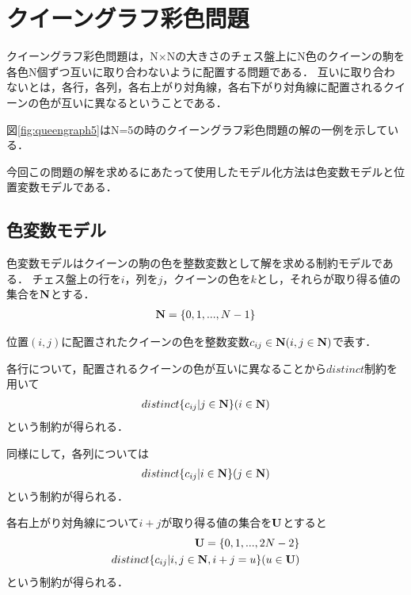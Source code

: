 \chapter{クイーングラフ彩色問題}

クイーングラフ彩色問題は，N×Nの大きさのチェス盤上にN色のクイーンの駒を各色N個ずつ互いに取り合わないように配置する問題である．
互いに取り合わないとは，各行，各列，各右上がり対角線，各右下がり対角線に配置されるクイーンの色が互いに異なるということである．

\label{fig:queengraph5}

図\ref{fig:queengraph5}はN=5の時のクイーングラフ彩色問題の解の一例を示している．

今回この問題の解を求めるにあたって使用したモデル化方法は色変数モデルと位置変数モデルである．

\section{色変数モデル}
色変数モデルはクイーンの駒の色を整数変数として解を求める制約モデルである．
チェス盤上の行を$i$，列を$j$，クイーンの色を$k$とし，それらが取り得る値の集合を$\bf N$とする．
\begin{eqnarray*}
    {\bf N} = \{0,1,...,N-1\}
\end{eqnarray*}

位置$(i,j)$に配置されたクイーンの色を整数変数$c_{ij} \in {\bf N} (i,j \in {\bf N})$で表す．

各行について，配置されるクイーンの色が互いに異なることから$distinct$制約を用いて
\begin{eqnarray*}
    distinct\{c_{ij} | j \in {\bf N} \} (i \in {\bf N})
\end{eqnarray*}
という制約が得られる．

同様にして，各列については
\begin{eqnarray*}
    distinct\{c_{ij} | i \in {\bf N} \} (j \in {\bf N})
\end{eqnarray*}
という制約が得られる．

各右上がり対角線について$i+j$が取り得る値の集合を$\bf U$とすると
\begin{eqnarray*}
    {\bf U} = \{0,1,...,2N-2\} \\
    distinct\{c_{ij} | i,j \in {\bf N}, i+j=u \} (u \in {\bf U})
\end{eqnarray*}
という制約が得られる．

